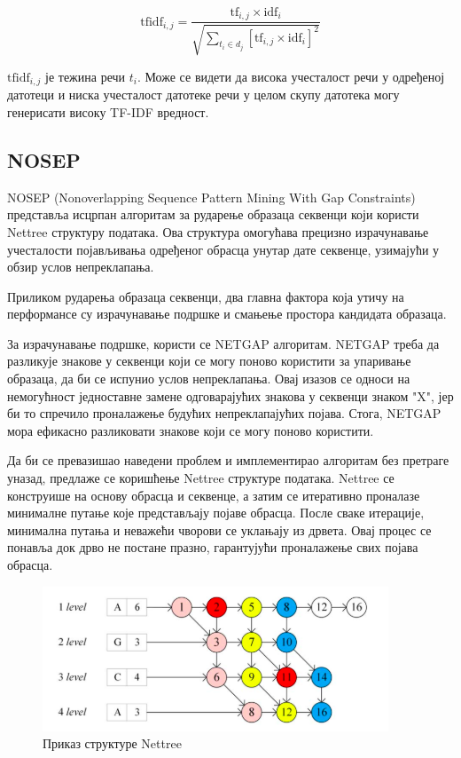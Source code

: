 \documentclass[12pt]{article}
\begin{document}
$$\mathrm{tfidf}_{i,j} = \frac{\mathrm{tf}_{i,j} \times \mathrm{idf}_{i}}{\sqrt{\sum_{t_i \in d_j} \left[\mathrm{tf}_{i,j} \times \mathrm{idf}_i\right]^2}}$$


$\mathrm{tfidf}_{i,j}$ је тежина речи ${t}_{i}$. Може се видети да висока
учесталост речи у одређеној датотеци и ниска учесталост датотеке
речи у целом скупу датотека могу генерисати високу TF-IDF вредност. 

\subsection{NOSEP}

NOSEP \cite{8053457} (Nonoverlapping Sequence Pattern Mining With Gap Constraints) представља исцрпан алгоритам за рударење образаца секвенци који користи Nettree структуру података. Ова структура омогућава прецизно израчунавање учесталости појављивања одређеног обрасца унутар дате секвенце, узимајући у обзир услов непреклапања. 

Приликом рударења образаца секвенци, два главна фактора која утичу на перформансе су израчунавање подршке и смањење простора кандидата образаца. 

За израчунавање подршке, користи се NETGAP алгоритам. NETGAP треба да  разликује знакове у секвенци који се могу поново користити за упаривање образаца, да би се испунио услов непреклапања. Овај изазов се односи на немогућност једноставне замене одговарајућих знакова у секвенци знаком "X", јер би то спречило проналажење будућих непреклапајућих појава. Стога, NETGAP мора ефикасно разликовати знакове који се могу поново користити.

Да би се превазишао наведени проблем и имплементирао алгоритам без претраге уназад, предлаже се коришћење Nettree структуре података. Nettree се конструише на основу обрасца и секвенце, а затим се итеративно проналазе минималне путање које представљају појаве обрасца. После сваке итерације, минимална путања и неважећи чворови се уклањају из дрвета. Овај процес се понавља док дрво не постане празно, гарантујући проналажење свих појава обрасца.

\begin{figure}[h]
    \centering
    \vspace{0.2cm}
    \includegraphics[width=0.6\linewidth]{images/nettree.png}
    \caption{Приказ структуре Nettree}
    \vspace{0.2cm}
    \label{fig:nettree}
\end{figure}
\end{document}
